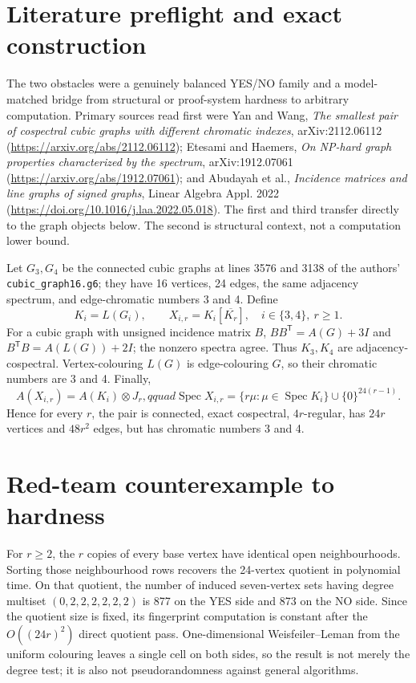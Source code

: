 \documentclass[11pt]{article}
\begin{document}
\section{Literature preflight and exact construction}
The two obstacles were a genuinely balanced YES/NO family and a model-matched bridge
from structural or proof-system hardness to arbitrary computation.  Primary sources
read first were Yan and Wang, \emph{The smallest pair of cospectral cubic graphs with
different chromatic indexes}, arXiv:2112.06112
(\url{https://arxiv.org/abs/2112.06112}); Etesami and Haemers, \emph{On NP-hard graph
properties characterized by the spectrum}, arXiv:1912.07061
(\url{https://arxiv.org/abs/1912.07061}); and Abudayah et al., \emph{Incidence matrices
and line graphs of signed graphs}, Linear Algebra Appl. 2022
(\url{https://doi.org/10.1016/j.laa.2022.05.018}).  The first and third transfer
directly to the graph objects below.  The second is structural context, not a
computation lower bound.

Let $G_3,G_4$ be the connected cubic graphs at lines 3576 and 3138 of the authors'
\texttt{cubic\_graph16.g6}; they have 16 vertices, 24 edges, the same adjacency
spectrum, and edge-chromatic numbers 3 and 4.  Define
\[
K_i=L(G_i),\qquad X_{i,r}=K_i[\overline{K_r}],\quad i\in\{3,4\},\ r\ge1.
\]
For a cubic graph with unsigned incidence matrix $B$,
$BB^{\mathsf T}=A(G)+3I$ and $B^{\mathsf T}B=A(L(G))+2I$; the nonzero spectra agree.
Thus $K_3,K_4$ are adjacency-cospectral.  Vertex-colouring $L(G)$ is edge-colouring
$G$, so their chromatic numbers are 3 and 4.  Finally,
\[
A(X_{i,r})=A(K_i)\otimes J_r,qquad
\operatorname{Spec}X_{i,r}=\{r\mu:\mu\in\operatorname{Spec}K_i\}
\cup\{0\}^{24(r-1)}.
\]
Hence for every $r$, the pair is connected, exact cospectral, $4r$-regular, has
$24r$ vertices and $48r^2$ edges, but has chromatic numbers 3 and 4.

\section{Red-team counterexample to hardness}
For $r\ge2$, the $r$ copies of every base vertex have identical open neighbourhoods.
Sorting those neighbourhood rows recovers the 24-vertex quotient in polynomial time.
On that quotient, the number of induced seven-vertex sets having degree multiset
$(0,2,2,2,2,2,2)$ is 877 on the YES side and 873 on the NO side.  Since the quotient
size is fixed, its fingerprint computation is constant after the $O((24r)^2)$ direct
quotient pass.  One-dimensional Weisfeiler--Leman from the uniform colouring leaves a
single cell on both sides, so the result is not merely the degree test; it is also not
pseudorandomness against general algorithms.
\end{document}

